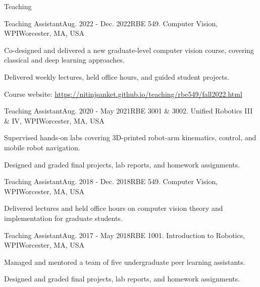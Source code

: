\documentclass{resume} %
\begin{document}
\begin{rSection}{Teaching}

\begin{rSubsection}
{Teaching Assistant}{Aug. 2022 - Dec. 2022}{RBE 549. Computer Vision, WPI}{Worcester, MA, USA}
\item Co-designed and delivered a new graduate-level computer vision course, covering classical and deep learning approaches.
\item Delivered weekly lectures, held office hours, and guided student projects.
\item Course website: \url{https://nitinjsanket.github.io/teaching/rbe549/fall2022.html}
\end{rSubsection}

\begin{rSubsection}
{Teaching Assistant}{Aug. 2020 - May 2021}{RBE 3001 \& 3002. Unified Robotics III \& IV, WPI}{Worcester, MA, USA}
\item Supervised hands-on labs covering 3D-printed robot-arm kinematics, control, and mobile robot navigation.
\item Designed and graded final projects, lab reports, and homework assignments.
\end{rSubsection}

\begin{rSubsection}{Teaching Assistant}{Aug. 2018 - Dec. 2018}{RBE 549. Computer Vision, WPI}{Worcester, MA, USA}
\item Delivered lectures and held office hours on computer vision theory and implementation for graduate students.
\end{rSubsection}

\begin{rSubsection}{Teaching Assistant}{Aug. 2017 - May 2018}{RBE 1001. Introduction to Robotics, WPI}{Worcester, MA, USA}
\item Managed and mentored a team of five undergraduate peer learning assistants.
\item Designed and graded final projects, lab reports, and homework assignments.
\end{rSubsection}

\end{rSection}
\end{document}
